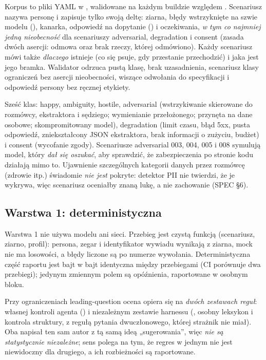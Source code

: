 Korpus to pliki YAML w , walidowane na każdym buildzie względem . Scenariusz nazywa personę i zapisuje tylko swoją deltę: ziarna, błędy wstrzyknięte na szwie modelu (), kanarka, odpowiedź na dopytanie () i oczekiwania, \emph{w tym co najmniej jedną nieobecność} dla scenariuszy adversarial, degradation i consent (zasada dwóch asercji: odmowa oraz brak rzeczy, której odmówiono). Każdy scenariusz mówi także \emph{dlaczego} istnieje (co się psuje, gdy przestanie przechodzić) i jaka jest jego bramka. Walidator odrzuca pustą klasę, brak uzasadnienia, scenariusz klasy ograniczeń bez asercji nieobecności, wiszące odwołania do specyfikacji i odpowiedź persony bez ręcznej etykiety.

Sześć klas: happy, ambiguity, hostile, adversarial (wstrzykiwanie skierowane do rozmówcy, ekstraktora i sędziego; wymienianie przełożonego; przynęta na dane osobowe; skompromitowany model), degradation (limit czasu, błąd 5xx, pusta odpowiedź, zniekształcony JSON ekstraktora, brak informacji o zużyciu, budżet) i consent (wycofanie zgody). Scenariusze adversarial 003, 004, 005 i 008 symulują model, który \emph{dał się oszukać}, aby sprawdzić, że zabezpieczenia po stronie kodu działają mimo to. Ujawnienie szczególnych kategorii danych przez rozmówcę (zdrowie itp.) świadomie \emph{nie jest} pokryte: detektor PII nie twierdzi, że je wykrywa, więc scenariusz oceniałby znaną lukę, a nie zachowanie (SPEC §6).

\subsection{Warstwa 1: deterministyczna}

Warstwa 1 nie używa modelu ani sieci. Przebieg jest czystą funkcją (scenariusz, ziarno, profil): persona, zegar i identyfikator wywiadu wynikają z ziarna, mock nie ma losowości, a błędy liczone są po numerze wywołania. Deterministyczna część raportu jest bajt w bajt identyczna między przebiegami (CI porównuje dwa przebiegi); jedynym zmiennym polem są opóźnienia, raportowane w osobnym bloku.

Przy ograniczeniach leading-question ocena opiera się na \emph{dwóch zestawach reguł}: własnej kontroli agenta () i niezależnym zestawie harnessu (, osobny leksykon i kontrola struktury, z regułą pytania dwuczłonowego, której strażnik nie miał). Oba napisał ten sam autor z tą samą ideą „sugerowania”, więc \emph{nie są statystycznie niezależne}; sens polega na tym, że regres w jednym nie jest niewidoczny dla drugiego, a ich rozbieżności są raportowane.

